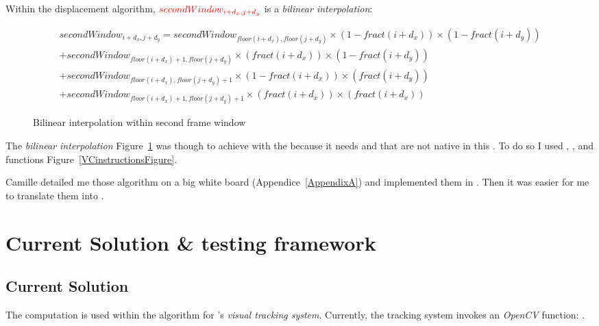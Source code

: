 Within the displacement algorithm, $\textcolor{red}{secondWindow_{i+d_{x},j+d_{y}}}$ is a \emph{bilinear interpolation}:

\begin{figure}[!htbp]
\begin{equation*}
	\begin{split}
		secondWindow_{i+d_{x},j+d_{y}} = secondWindow_{floor(i+d_{x}),floor(j+d_{y})}\times (1-fract(i+d_{x}))\times (1-fract(i+d_{y}))\\
		+ secondWindow_{floor(i+d_{x})+1,floor(j+d_{y})}\times (fract(i+d_{x}))\times (1-fract(i+d_{y}))\\
		+ secondWindow_{floor(i+d_{x}),floor(j+d_{y})+1}\times (1-fract(i+d_{x}))\times (fract(i+d_{y}))\\
		+ secondWindow_{floor(i+d_{x})+1,floor(j+d_{y})+1} \times (fract(i+d_{x}))\times (fract(i+d_{x}))
	\end{split}
\end{equation*}
\caption{Bilinear interpolation within second frame window}
\label{BIPFig}
\end{figure}
\FloatBarrier

The \emph{bilinear interpolation} Figure~\ref{BIPFig} was though to achieve with the \vc{} because it needs  and  that are not native in this . To do so I used , , and  functions Figure~\ref{VCinstructionsFigure}.


Camille detailed me those algorithm on a big white board (Appendice~\ref{AppendixA}) and implemented them in . Then it was easier for me to translate them into .


\section{Current Solution \& testing framework}

\subsection{Current Solution}

The \flow{} computation is used within the  algorithm for \iBubble's \emph{visual tracking system}. Currently, the tracking system invokes an \emph{OpenCV} function: .

